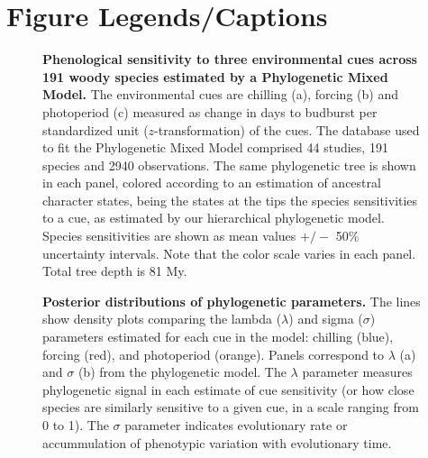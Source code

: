 \documentclass[11pt]{article}
\begin{document}
\section*{Figure Legends/Captions} 


\begin{figure} [h!]
  \caption{\textbf{Phenological sensitivity to three environmental cues across 191 woody species estimated by a Phylogenetic Mixed Model.} The environmental cues are chilling (a), forcing (b) and photoperiod (c) measured as change in days to budburst per standardized unit ($z$-transformation) of the cues. The database used to fit the Phylogenetic Mixed Model comprised 44 studies, 191 species and 2940 observations. The same phylogenetic tree is shown in each panel, colored according to an estimation of ancestral character states, being the states at the tips the species sensitivities to a cue, as estimated by our hierarchical phylogenetic model. Species sensitivities are shown as mean values $+/-$ 50\% uncertainty intervals. Note that the color scale varies in each panel. Total tree depth is 81 My.}
  \label{fig:muplot_all}
\end{figure}

\begin{figure} [h!]
  \caption{\textbf{Posterior distributions of phylogenetic parameters.} The lines show density plots comparing the lambda ($\lambda$) and sigma ($\sigma$) parameters estimated for each cue in the model: chilling (blue), forcing (red), and photoperiod (orange). Panels correspond to $\lambda$ (a) and $\sigma$ (b) from the phylogenetic model. The $\lambda$ parameter measures phylogenetic signal in each estimate of cue sensitivity (or how close species are similarly sensitive to a given cue, in a scale ranging from 0 to 1). The $\sigma$ parameter indicates evolutionary rate or accummulation of phenotypic variation with evolutionary time.}
  \label{fig:phylosig_all}
\end{figure}
\end{document}
